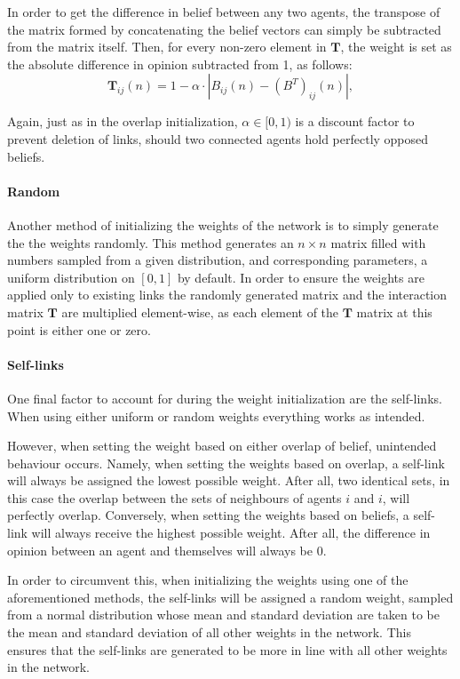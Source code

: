\documentclass[a4paper, 12pt]{report}
\newcommand{\T}{\bm{T}}
\begin{document}
In order to get the difference in belief between any two agents, the transpose of the matrix formed by concatenating the belief vectors can simply be subtracted from the matrix itself. Then, for every non-zero element in $\T$, the weight is set as the absolute difference in opinion subtracted from 1, as follows:
\begin{equation*}
    \T_{ij}(n) = 1 - \alpha \cdot |B_{ij}(n) - (B^{T})_{ij}(n)|,
\end{equation*}

Again, just as in the overlap initialization, $\alpha \in [0, 1)$ is a discount factor to prevent deletion of links, should two connected agents hold perfectly opposed beliefs.

\paragraph{Random}
Another method of initializing the weights of the network is to simply generate the the weights randomly. This method generates an $n \times n$ matrix filled with numbers sampled from a given distribution, and corresponding parameters, a uniform distribution on $[0, 1]$ by default. In order to ensure the weights are applied only to existing links the randomly generated matrix and the interaction matrix $\T$ are multiplied element-wise, as each element of the $\T$ matrix at this point is either one or zero.

\paragraph{Self-links}

One final factor to account for during the weight initialization are the self-links. When using either uniform or random weights everything works as intended. 

However, when setting the weight based on either overlap of belief, unintended behaviour occurs.
Namely, when setting the weights based on overlap, a self-link will always be assigned the lowest possible weight. After all, two identical sets, in this case the overlap between the sets of neighbours of agents $i$ and $i$, will perfectly overlap.
Conversely, when setting the weights based on beliefs, a self-link will always receive the highest possible weight. After all, the difference in opinion between an agent and themselves will always be $0$.

In order to circumvent this, when initializing the weights using one of the aforementioned methods, the self-links will be assigned a random weight, sampled from a normal distribution whose mean and standard deviation are taken to be the mean and standard deviation of all other weights in the network. This ensures that the self-links are generated to be more in line with all other weights in the network.
\end{document}
